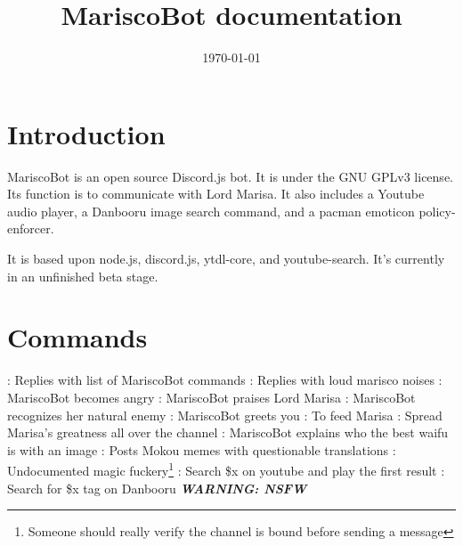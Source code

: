 \documentclass{article}
\begin{document}
\title{MariscoBot documentation}
\date{\today{}}
\maketitle{}
\tableofcontents
\newpage
\section{Introduction}
MariscoBot is an open source Discord.js bot. It is under the GNU GPLv3 license. Its function is to communicate with Lord Marisa. It also includes a Youtube audio player, a Danbooru image search command, and a pacman emoticon policy-enforcer.\

It is based upon node.js, discord.js, ytdl-core, and youtube-search. It's currently in an unfinished beta stage.\

\section{Commands}
\begin{flushleft}
\noindent{} : Replies with list of MariscoBot commands\newline
\noindent{} : Replies with loud marisco noises\newline
\noindent{} : MariscoBot becomes angry\newline
\noindent{} : MariscoBot praises Lord Marisa\newline
\noindent{} : MariscoBot recognizes her natural enemy\newline
\noindent{} : MariscoBot greets you\newline
\noindent{} : To feed Marisa\newline
\noindent{} : Spread Marisa's greatness all over the channel\newline
\noindent{} : MariscoBot explains who the best waifu is with an image\newline
\noindent{} : Posts Mokou memes with questionable translations\newline
\noindent{} : Undocumented magic fuckery\footnote{Someone should really verify the channel is bound before sending a message}\newline
\noindent{} : Search \$x on youtube and play the first result\newline
\noindent{} : Search for \$x tag on Danbooru \textbf{\emph{WARNING: NSFW}}\par
\end{flushleft}
\end{document}
